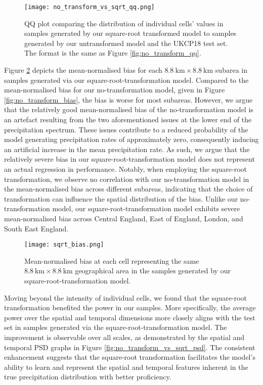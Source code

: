 \documentclass[ oneside,%
                    author={George Herbert},
                    degree={MSci},
                     title={Video Diffusion Models for Climate Simulations},
                  subtitle={}]{dissertation}
\begin{document}
\begin{figure}[htbp]
      \centering
      \texttt{[image: no\_transform\_vs\_sqrt\_qq.png]}
      \caption{QQ plot comparing the distribution of individual cells' values in samples generated by our square-root transformed model to samples generated by our untransformed model and the UKCP18 test set. The format is the same as Figure \ref{fig:no_transform_qq}.}
      \label{fig:no_transform_vs_sqrt_qq}
\end{figure}

Figure \ref{fig:sqrt_bias} depicts the mean-normalised bias for each $8.8\ \mathrm{km}\times 8.8\ \mathrm{km}$ subarea in samples generated via our square-root-transformation model. Compared to the mean-normalised bias for our no-transformation model, given in Figure \ref{fig:no_transform_bias}, the bias is worse for most subareas. However, we argue that the relatively good mean-normalised bias of the no-transformation model is an artefact resulting from the two aforementioned issues at the lower end of the precipitation spectrum. These issues contribute to a reduced probability of the model generating precipitation rates of approximately zero, consequently inducing an artificial increase in the mean precipitation rate. As such, we argue that the relatively severe bias in our square-root-transformation model does not represent an actual regression in performance. Notably, when employing the square-root transformation, we observe no correlation with our no-transformation model in the mean-normalised bias across different subareas, indicating that the choice of transformation can influence the spatial distribution of the bias. Unlike our no-transformation model, our square-root-transformation model exhibits severe mean-normalised bias across Central England, East of England, London, and South East England.

\begin{figure}[htbp]
      \centering
      \texttt{[image: sqrt\_bias.png]}
      \caption{Mean-normalised bias at each cell representing the same $8.8\ \mathrm{km}\times 8.8\ \mathrm{km}$ geographical area in the samples generated by our square-root-transformation model.}
      \label{fig:sqrt_bias}
\end{figure}

Moving beyond the intensity of individual cells, we found that the square-root transformation benefited the power in our samples. More specifically, the average power over the spatial and temporal dimensions more closely aligns with the test set in samples generated via the square-root-transformation model. The improvement is observable over all scales, as demonstrated by the spatial and temporal PSD graphs in Figure \ref{fig:no_transform_vs_sqrt_psd}. The consistent enhancement suggests that the square-root transformation facilitates the model's ability to learn and represent the spatial and temporal features inherent in the true precipitation distribution with better proficiency.
\end{document}
